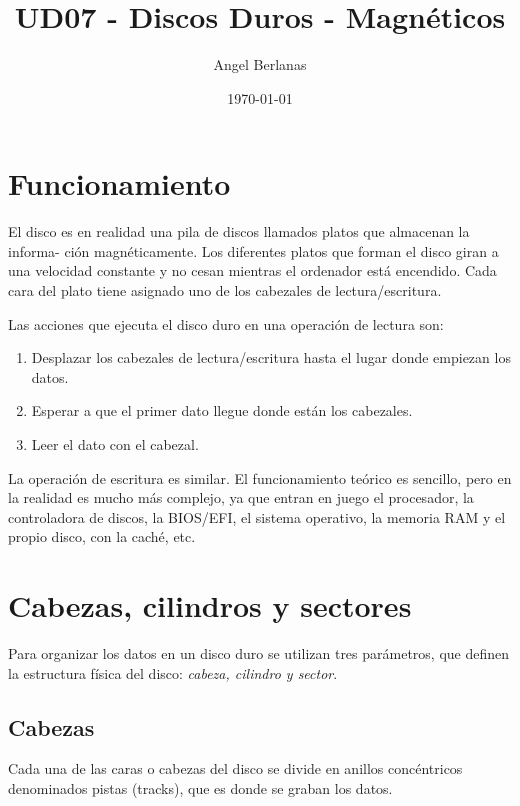 \documentclass[11pt]{article}
\author{Angel Berlanas}
\date{\today}
\title{UD07 - Discos Duros - Magnéticos}
\begin{document}
\maketitle
\tableofcontents



\section{Funcionamiento}
\label{sec:org798a161}

El disco es en realidad una pila de discos llamados platos que almacenan la informa-
ción magnéticamente. Los diferentes platos que forman el disco giran a una velocidad
constante y no cesan mientras el ordenador está encendido. Cada cara del plato tiene
asignado uno de los cabezales de lectura/escritura.

Las acciones que ejecuta el disco duro en una operación de lectura son:

\begin{enumerate}
\item Desplazar los cabezales de lectura/escritura hasta el lugar donde empiezan los datos.
\item Esperar a que el primer dato llegue donde están los cabezales.
\item Leer el dato con el cabezal.
\end{enumerate}

La operación de escritura es similar. El funcionamiento teórico es sencillo, pero en la
realidad es mucho más complejo, ya que entran en juego el procesador, la controladora
de discos, la BIOS/EFI, el sistema operativo, la memoria RAM y el propio disco,
con la caché, etc.

\section{Cabezas, cilindros y sectores}
\label{sec:org9a712f6}

Para organizar los datos en un disco duro se utilizan tres parámetros, que definen la
estructura física del disco: \emph{cabeza, cilindro y sector}.

\subsection{Cabezas}
\label{sec:orge0d26dd}

Cada una de las caras o cabezas del disco se divide en anillos concéntricos denominados pistas (tracks), que es donde se graban los datos.
\end{document}
